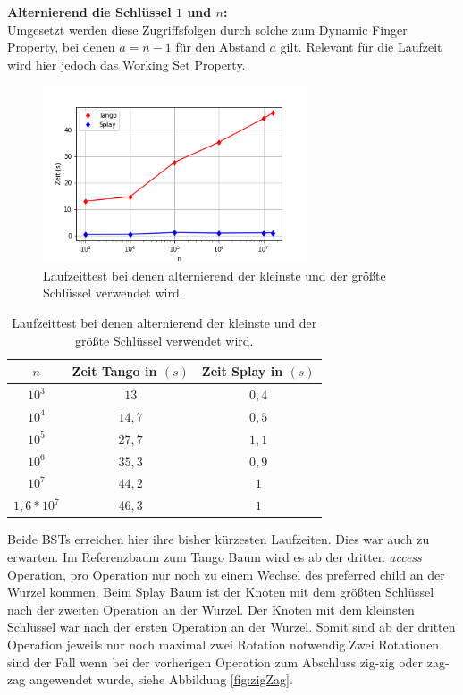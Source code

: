 \documentclass[a4paper,12pt]{article}
\begin{document}
\noindent \textbf{Alternierend die Schlüssel $1$ und $n$:\\}
 \bigskip
\noindent Umgesetzt werden diese Zugriffsfolgen durch solche zum Dynamic Finger Property, bei denen $a = n -1$ für den Abstand $a$ gilt. Relevant für die Laufzeit wird hier jedoch das Working Set Property.

\begin{figure}[H]
	\centering
	\includegraphics[width=0.7\textwidth]{"Medien/laufzeittest/diagramm/kleinGros"}
	\caption{Laufzeittest bei denen alternierend der kleinste und der größte Schlüssel verwendet wird.}
\end{figure}
\begin{table}[H]
	\begin{center}
		\begin{tabular}[c]{|c|c|c|}
			\hline
			$n$ & Zeit Tango in $\left(s\right)$ &Zeit Splay in $\left(s\right)$ \\
			\hline
			$10^3$ & $13$ &$0,4$ \\
			\hline
			$10^4$  & $14,7$ &$0,5$  \\
			\hline
			$10^5$  & $27,7$ &$1,1$  \\
			\hline
			$10^6$  & $35,3$ &$0,9$  \\
			\hline
			$10^7$  & $44,2$ &$1$  \\
			\hline
			$1,6 *10^7$  & $46,3$ &$1$  \\
			\hline
		\end{tabular}
		\caption{Laufzeittest bei denen alternierend der kleinste und der größte Schlüssel verwendet wird.} 
	\end{center}
\end{table}
\noindent Beide BSTs erreichen hier ihre bisher kürzesten Laufzeiten. Dies war auch zu erwarten. Im Referenzbaum zum Tango Baum wird es ab der dritten \textit{access} Operation, pro Operation nur noch zu einem Wechsel des preferred child an der Wurzel kommen. Beim Splay Baum ist der Knoten mit dem größten Schlüssel nach der zweiten Operation an der Wurzel. Der Knoten mit dem kleinsten Schlüssel war nach der ersten Operation an der Wurzel. Somit sind ab der dritten Operation jeweils nur noch maximal zwei Rotation notwendig.Zwei Rotationen sind der Fall wenn bei der vorherigen Operation zum Abschluss zig-zig oder zag-zag angewendet wurde, siehe Abbildung \ref{fig:zigZag}.
 
\end{document}
